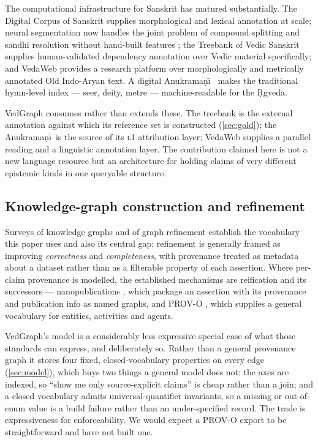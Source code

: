 The computational infrastructure for Sanskrit has matured substantially. The Digital
Corpus of Sanskrit \citep{hellwig2021dcs} supplies morphological and lexical
annotation at scale; neural segmentation now handles the joint problem of compound
splitting and sandhi resolution without hand-built features
\citep{hellwig2018segmentation}; the Treebank of Vedic Sanskrit
\citep{hellwig2020vedic} supplies human-validated dependency annotation over Vedic
material specifically; and VedaWeb \citep{kiss2019vedaweb} provides a research
platform over morphologically and metrically annotated Old Indo-Aryan text. A
digital Anukrama\d{n}\=\i\ \citep{akavarapu2023anukramani} makes the traditional
hymn-level index --- seer, deity, metre --- machine-readable for the \d{R}gveda.

VedGraph consumes rather than extends these. The treebank is the external annotation
against which its reference set is constructed (\cref{sec:gold}); the Anukrama\d{n}\=\i\
is the source of its \textsc{l1} attribution layer; VedaWeb supplies a parallel
reading and a linguistic annotation layer. The contribution claimed here is not a new
language resource but an architecture for holding claims of very different
epistemic kinds in one queryable structure.

\subsection{Knowledge-graph construction and refinement}

Surveys of knowledge graphs \citep{hogan2021knowledge} and of graph refinement
\citep{paulheim2017refinement} establish the vocabulary this paper uses and also its
central gap: refinement is generally framed as improving \emph{correctness} and
\emph{completeness}, with provenance treated as metadata about a dataset rather than
as a filterable property of each assertion. Where per-claim provenance is modelled,
the established mechanisms are reification and its successors --- nanopublications
\citep{groth2010nanopublication}, which package an assertion with its provenance and
publication info as named graphs, and PROV-O \citep{lebo2013provo}, which supplies a
general vocabulary for entities, activities and agents.

VedGraph's model is a considerably less expressive special case of what those
standards can express, and deliberately so. Rather than a general provenance graph
it stores four fixed, closed-vocabulary properties on every edge
(\cref{sec:model}), which buys two things a general model does not: the axes are
indexed, so ``show me only source-explicit claims'' is cheap rather than a join; and
a closed vocabulary admits universal-quantifier invariants, so a missing or
out-of-enum value is a build failure rather than an under-specified record. The
trade is expressiveness for enforceability. We would expect a PROV-O export to be
straightforward and have not built one.

